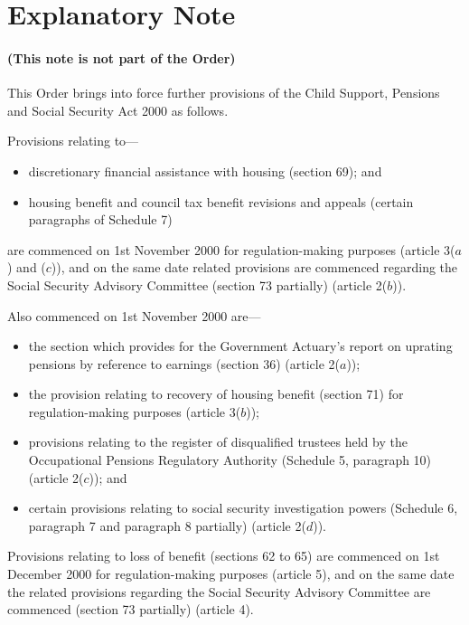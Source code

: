 \documentclass[12pt,a4paper]{article}
\begin{document}
\part{Explanatory Note}

\renewcommand\parthead{--- Explanatory Note}

\subsection*{(This note is not part of the Order)}

This Order brings into force further provisions of the Child Support, Pensions and Social Security Act 2000 as follows.

Provisions relating to—
\begin{itemize}
\item    discretionary financial assistance with housing (section 69); and

\item    housing benefit and council tax benefit revisions and appeals (certain paragraphs of Schedule 7) 
\end{itemize}
are commenced on 1st November 2000 for regulation-making purposes (article 3($a$)  and ($c$)), and on the same date related provisions are commenced regarding the Social Security Advisory Committee (section 73 partially) (article 2($b$)).

Also commenced on 1st November 2000 are—
\begin{itemize}
\item    the section which provides for the Government Actuary’s report on uprating pensions by reference to earnings (section 36) (article 2($a$));

\item    the provision relating to recovery of housing benefit (section 71) for regulation\hspace{0pt}-making purposes (article 3($b$));

\item    provisions relating to the register of disqualified trustees held by the Occupational Pensions Regulatory Authority (Schedule 5, paragraph 10) (article 2($c$)); and

\item    certain provisions relating to social security investigation powers (Schedule 6, paragraph 7 and paragraph 8 partially) (article 2($d$)). 
\end{itemize}

Provisions relating to loss of benefit (sections 62 to 65) are commenced on 1st December 2000 for regulation-making purposes (article 5), and on the same date the related provisions regarding the Social Security Advisory Committee are commenced (section 73 partially) (article 4).
\end{document}
